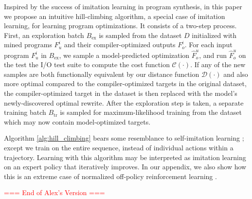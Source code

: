\documentclass{article}
\begin{document}

Inspired by the success of imitation learning in program synthesis, in this paper we propose an intuitive hill-climbing algorithm, a special case of imitation learning, for learning program optimizations. 
It consists of a two-step process. 
First, an exploration batch $B_{\mathrm{ex}}$ is sampled from the dataset $D$ initialized with mined programs $F^i_u$ and their compiler-optimized outputs $F^i_o$. 
For each input program $F^i_u$ in $B_{\mathrm{ex}}$, we sample a model-predicted optimization $\hat{F}^u_o$, and run $\hat{F}^u_o$ on the test the I/O test suite to compute the cost function $\mathcal{C}(\cdot)$.
If any of the new samples are both functionally equivalent by our distance function $\mathcal{D}(\cdot)$ and also more optimal compared to the compiler-optimized targets in the original dataset, the compiler-optimized target in the dataset is then replaced with the model's newly-discovered optimal rewrite. 
After the exploration step is taken, a separate training batch $B_{\mathrm{tr}}$ is sampled for maximum-likelihood training from the dataset which may now contain model-optimized targets. 

Algorithm \ref{alg:hill_climbing} bears some resemblance to self-imitation learning \cite{oh2018self} ; except we train on the entire sequence, instead of individual actions within a trajectory. Learning with this algorithm may be interpreted as imitation learning on an expert policy that iteratively improves. In our appendix, we also show how this is an extreme case of normalized off-policy reinforcement learning . 

\textcolor{red}{=== End of Alex's Version ===}
\end{document}
